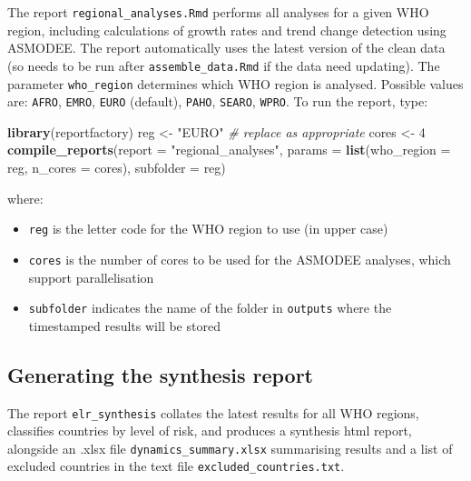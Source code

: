 \documentclass[]{book}
\newenvironment{Shaded}{\begin{snugshade}}{\end{snugshade}}
\newcommand{\CommentTok}[1]{\textcolor[rgb]{0.56,0.35,0.01}{\textit{#1}}}
\newcommand{\DataTypeTok}[1]{\textcolor[rgb]{0.13,0.29,0.53}{#1}}
\newcommand{\DecValTok}[1]{\textcolor[rgb]{0.00,0.00,0.81}{#1}}
\newcommand{\KeywordTok}[1]{\textcolor[rgb]{0.13,0.29,0.53}{\textbf{#1}}}
\newcommand{\NormalTok}[1]{#1}
\newcommand{\StringTok}[1]{\textcolor[rgb]{0.31,0.60,0.02}{#1}}
\providecommand{\tightlist}{%
  \setlength{\itemsep}{0pt}\setlength{\parskip}{0pt}}
\begin{document}
The report \texttt{regional\_analyses.Rmd} performs all analyses for a given WHO region,
including calculations of growth rates and trend change detection using
ASMODEE. The report automatically uses the latest version of the clean data (so
needs to be run after \texttt{assemble\_data.Rmd} if the data need updating). The
parameter \texttt{who\_region} determines which WHO region is analysed. Possible values
are: \texttt{AFRO}, \texttt{EMRO}, \texttt{EURO} (default), \texttt{PAHO}, \texttt{SEARO}, \texttt{WPRO}. To run the
report, type:

\begin{Shaded}
\begin{Highlighting}[]

\KeywordTok{library}\NormalTok{(reportfactory)}
\NormalTok{reg <-}\StringTok{ "EURO"} \CommentTok{# replace as appropriate}
\NormalTok{cores <-}\StringTok{ }\DecValTok{4}
\KeywordTok{compile_reports}\NormalTok{(}\DataTypeTok{report =} \StringTok{"regional_analyses"}\NormalTok{,}
                \DataTypeTok{params =} \KeywordTok{list}\NormalTok{(}\DataTypeTok{who_region =}\NormalTok{ reg, }\DataTypeTok{n_cores =}\NormalTok{ cores),}
                \DataTypeTok{subfolder =}\NormalTok{ reg)}
\end{Highlighting}
\end{Shaded}

where:

\begin{itemize}
\tightlist
\item
  \texttt{reg} is the letter code for the WHO region to use (in upper case)
\item
  \texttt{cores} is the number of cores to be used for the ASMODEE analyses, which
  support parallelisation
\item
  \texttt{subfolder} indicates the name of the folder in \texttt{outputs} where the
  timestamped results will be stored
\end{itemize}

\hypertarget{generating-the-synthesis-report}{%
\subsection{Generating the synthesis report}\label{generating-the-synthesis-report}}

The report \texttt{elr\_synthesis} collates the latest results for all WHO regions,
classifies countries by level of risk, and produces a synthesis html report,
alongside an .xlsx file \texttt{dynamics\_summary.xlsx} summarising results and a list
of excluded countries in the text file \texttt{excluded\_countries.txt}.
\end{document}
